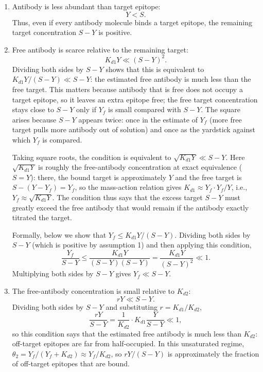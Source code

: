 \documentclass[11pt]{article}
\begin{document}
\begin{enumerate}
    \item Antibody is less abundant than target epitope:
    $$
    Y<S.
    $$
    Thus, even if every antibody molecule binds a target epitope, the
    remaining target concentration $S-Y$ is positive.

    \item Free antibody is scarce relative to the remaining target:
    $$
    K_{d1}Y\ll(S-Y)^2.
    $$
    Dividing both sides by $S-Y$ shows that this is equivalent to
    $K_{d1}Y/(S-Y)\ll S-Y$: the estimated free antibody is much less than
    the free target. This matters because antibody that is free does not
    occupy a target epitope, so it leaves an extra epitope free; the free
    target concentration stays close to $S-Y$ only if $Y_f$ is small
    compared with $S-Y$. The square arises because $S-Y$ appears twice:
    once in the estimate of $Y_f$ (more free target pulls more antibody out
    of solution) and once as the yardstick against which $Y_f$ is compared.

    Taking square roots, the condition is equivalent to
    $\sqrt{K_{d1}Y}\ll S-Y$. Here $\sqrt{K_{d1}Y}$ is roughly the
    free-antibody concentration at exact equivalence ($S=Y$): there, the
    bound target is approximately $Y$ and the free target is
    $S-(Y-Y_f)=Y_f$, so the mass-action relation gives
    $K_{d1}\approx Y_f\cdot Y_f/Y$, i.e., $Y_f\approx\sqrt{K_{d1}Y}$. The
    condition thus says that the excess target $S-Y$ must greatly exceed
    the free antibody that would remain if the antibody exactly titrated the
    target.

    Formally, below we show that $Y_f\le K_{d1}Y/(S-Y)$. Dividing both
    sides by $S-Y$ (which is positive by assumption 1) and then applying
    this condition,
    $$
    \frac{Y_f}{S-Y}
    \le\frac{K_{d1}Y}{(S-Y)(S-Y)}
    =\frac{K_{d1}Y}{(S-Y)^2}
    \ll1.
    $$
    Multiplying both sides by $S-Y$ gives $Y_f\ll S-Y$.

    \item The free-antibody concentration is small relative to $K_{d2}$:
    $$
    rY\ll S-Y.
    $$
    Dividing both sides by $S-Y$ and substituting $r=K_{d1}/K_{d2}$,
    $$
    \frac{rY}{S-Y}
    =\frac{1}{K_{d2}}\cdot K_{d1}\frac{Y}{S-Y}
    \ll1,
    $$
    so this condition says that the estimated free antibody is much less
    than $K_{d2}$: off-target epitopes are far from half-occupied. In this
    unsaturated regime, $\theta_2=Y_f/(Y_f+K_{d2})\approx Y_f/K_{d2}$, so
    $rY/(S-Y)$ is approximately the fraction of off-target epitopes that are
    bound.


\end{enumerate}
\end{document}
